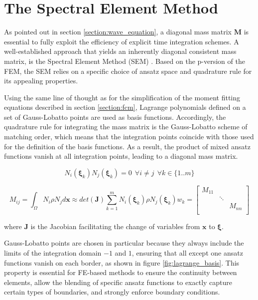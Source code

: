 %
\section{The Spectral Element Method}
\label{section:sem}
%

As pointed out in section \ref{section:wave_equation}, a diagonal mass matrix $\mathbf M$ is essential to fully exploit the efficiency of explicit time integration schemes. A well-established approach that yields an inherently diagonal consistent mass matrix, is the Spectral Element Method (SEM) \cite{Maggio1994}. Based on the p-version of the FEM, the SEM relies on a specific choice of ansatz space and quadrature rule for its appealing properties.

Using the same line of thought as for the simplification of the moment fitting equations described in section \ref{section:fcm}, Lagrange polynomials defined on a set of Gauss-Lobatto points are used as basis functions. Accordingly, the quadrature rule for integrating the mass matrix is the Gauss-Lobatto scheme of matching order, which means that the integration points coincide with those used for the definition of the basis functions. As a result, the product of mixed ansatz functions vanish at all integration points, leading to a diagonal mass matrix.

\begin{equation}
	N_i(\boldsymbol{\xi}_k)N_j(\boldsymbol{\xi}_k) = 0 \ \ \forall i \neq j \ \ \forall k \in \{1..m\}
\end{equation}

\begin{equation}
	M_{ij} = \int_{\Omega} N_i \rho N_j d\mathbf x
	\approx
	det(\mathbf J) \sum_{k=1}^m N_i(\boldsymbol{\xi}_k) \rho N_j(\boldsymbol{\xi}_k) w_k
	=
	\begin{bmatrix}
		M_{11} & & \\
		& \ddots & \\
		& & M_{nn} \\
	\end{bmatrix}
\end{equation}

where $\mathbf J$ is the Jacobian facilitating the change of variables from $\mathbf x$ to $\boldsymbol{\xi}$.

Gauss-Lobatto points are chosen in particular because they always include the limits of the integration domain $-1$ and $1$, ensuring that all except one ansatz functions vanish on each border, as shown in figure \ref{fig:lagrange_basis}. This property is essential for FE-based methods to ensure the continuity between elements, allow the blending of specific ansatz functions to exactly capture certain types of boundaries, and strongly enforce boundary conditions.

